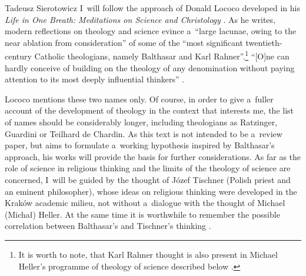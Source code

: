 \begin{artengenv}{Tadeusz Sierotowicz}
I~will follow the approach of Donald Lococo developed in his \textit{Life in One Breath: Meditations on Science and Christology} 
\parencite*[][]{lococo_life_2021}. %
 As he writes, modern reflections on theology and science evince a~``large lacunae, owing to the near ablation from consideration'' of some of the ``most significant twentieth-century Catholic theologians, namely Balthasar and Karl Rahner''.\footnote{It is worth to note, that Karl Rahner thought is also present in Michael Heller's programme of theology of science described below 
\parencites[cf.][pp.80–81]{macek_teologia_2014}[][p.13]{maziarka_w_2016}. %
 } ``[O]ne can hardly conceive of building on the theology of any denomination without paying attention to its most deeply influential thinkers'' 
\parencite[][p.11]{lococo_life_2021}.%




Lococo mentions these two names only. Of course, in order to give a~fuller account of the development of theology in the context that interests me, the list of names should be considerably longer, including theologians as Ratzinger, Guardini or Teilhard de Chardin. As this text is not intended to be a~review paper, but aims to formulate a~working hypothesis inspired by Balthasar's approach, his works will provide the basis for further considerations. As far as the role of science in religious thinking and the limits of the theology of science are concerned, I~will be guided by the thought of Józef Tischner (Polish priest and an eminent philosopher), whose ideas on religious thinking were developed in the Kraków academic milieu, not without a~dialogue with the thought of Michael (Michał) Heller. At the same time it is worthwhile to remember the possible correlation between Balthasar's and Tischner's thinking 
\parencite[see][]{wolowski_problem_2019}.%





\end{artengenv}
